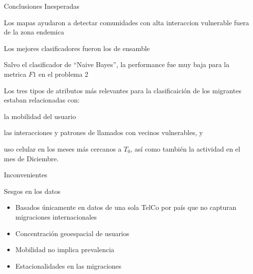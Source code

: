 \documentclass[xcolor=x11names]{beamer}
\begin{document}


\begin{frame}{Conclusiones Inesperadas}

	Los mapas ayudaron a detectar comunidades con alta interaccion vulnerable fuera de la zona endemica

	\medskip

	Los mejores clasificadores fueron los de ensamble

	\medskip
	Salvo el clasificador de ``Naive Bayes'', la performance fue muy baja para la metrica $F1$ en el problema 2

	\medskip
	Los tres tipos de atributos más relevantes para la clasificaición de los migrantes estaban relacionadas con:

	\begin{enumerate*}[label={\alph*)},]
		\item la mobilidad del usuario
		\item las interacciones y patrones de llamados con vecinos vulnerables, y
		\item uso celular en los meses más cercanos a $T_0$, así como también la actividad en el mes de Diciembre.
	\end{enumerate*}

\end{frame}


\begin{frame}{Inconvenientes}

		\begin{block}{Sesgos en los datos}
			\begin{itemize}
			\item Basados únicamente en datos de una sola TelCo por país que no capturan migraciones internacionales
			\item Concentración geoespacial de usuarios

			\item Mobilidad no implica prevalencia

			\item Estacionalidades en las migraciones

			\end{itemize}
 	 	\end{block}
\end{frame}
\end{document}
